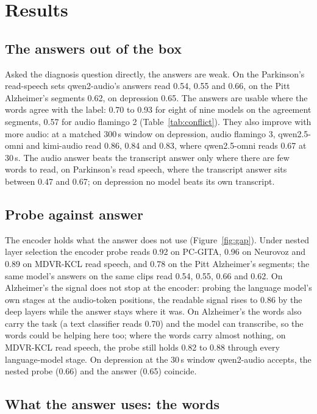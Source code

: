 \documentclass[conference]{IEEEtran}
\begin{document}
\section{Results}\label{sec:results}

\subsection{The answers out of the box}

Asked the diagnosis question directly, the answers are weak. On the Parkinson's read-speech
sets qwen2-audio's answers read 0.54, 0.55 and 0.66, on the Pitt Alzheimer's segments 0.62, on
depression 0.65. The answers are usable where the words agree with the label: 0.70 to 0.93 for
eight of nine models on the agreement segments, 0.57 for audio flamingo 2 (Table~\ref{tab:conflict}).
They also improve with more audio: at a matched 300\,s window on depression, audio flamingo 3,
qwen2.5-omni and kimi-audio read 0.86, 0.84 and 0.83, where qwen2.5-omni reads 0.67 at 30\,s. The
audio answer beats the transcript answer only where there are few words to read, on Parkinson's read
speech, where the transcript answer sits between 0.47 and 0.67; on depression no model beats its own
transcript.

\subsection{Probe against answer}\label{sec:gap}

The encoder holds what the answer does not use (Figure~\ref{fig:gap}). Under nested layer selection the encoder probe reads
0.92 on PC-GITA, 0.96 on Neurovoz and 0.89 on MDVR-KCL read speech, and 0.78 on the Pitt
Alzheimer's segments; the same model's answers on the same clips read
0.54, 0.55, 0.66 and 0.62. On Alzheimer's the signal does not stop at the encoder: probing the
language model's own stages at the audio-token positions, the readable signal rises to 0.86 by the
deep layers while the answer stays where it was. On Alzheimer's the words also carry the task (a
text classifier reads 0.70) and the model can transcribe, so the words could be helping here too; where
the words carry almost nothing, on MDVR-KCL read speech, the probe still holds 0.82 to 0.88 through
every language-model stage. On depression at the 30\,s window qwen2-audio accepts, the nested probe
(0.66) and the answer (0.65) coincide.

\subsection{What the answer uses: the words}
\end{document}
